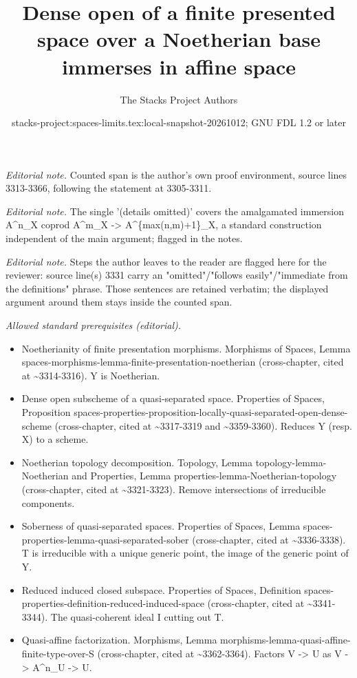 \documentclass{stacks-project}
\title{Dense open of a finite presented space over a Noetherian base immerses in affine space}
\author{The Stacks Project Authors}
\date{stacks-project:spaces-limits.tex:local-snapshot-20261012; GNU FDL 1.2 or later}
\theoremstyle{plain}
\theoremstyle{definition}
\theoremstyle{remark}
\numberwithin{equation}{subsection}
\begin{document}
\maketitle
\noindent\textit{Editorial note.} Counted span is the author's own proof environment, source lines 3313-3366, following the statement at 3305-3311.\par\medskip
\noindent\textit{Editorial note.} The single '(details omitted)' covers the amalgamated immersion A\textasciicircum{}n\_X coprod A\textasciicircum{}m\_X -> A\textasciicircum{}\{max(n,m)+1\}\_X, a standard construction independent of the main argument; flagged in the notes.\par\medskip
\noindent\textit{Editorial note.} Steps the author leaves to the reader are flagged here for the reviewer: source line(s) 3331 carry an "omitted"/"follows easily"/"immediate from the definitions" phrase. Those sentences are retained verbatim; the displayed argument around them stays inside the counted span.\par\medskip
\noindent\textit{Allowed standard prerequisites (editorial).}\begin{itemize}
\item Noetherianity of finite presentation morphisms. Morphisms of Spaces, Lemma spaces-morphisms-lemma-finite-presentation-noetherian (cross-chapter, cited at \textasciitilde{}3314-3316). Y is Noetherian.
\item Dense open subscheme of a quasi-separated space. Properties of Spaces, Proposition spaces-properties-proposition-locally-quasi-separated-open-dense-scheme (cross-chapter, cited at \textasciitilde{}3317-3319 and \textasciitilde{}3359-3360). Reduces Y (resp. X) to a scheme.
\item Noetherian topology decomposition. Topology, Lemma topology-lemma-Noetherian and Properties, Lemma properties-lemma-Noetherian-topology (cross-chapter, cited at \textasciitilde{}3321-3323). Remove intersections of irreducible components.
\item Soberness of quasi-separated spaces. Properties of Spaces, Lemma spaces-properties-lemma-quasi-separated-sober (cross-chapter, cited at \textasciitilde{}3336-3338). T is irreducible with a unique generic point, the image of the generic point of Y.
\item Reduced induced closed subspace. Properties of Spaces, Definition spaces-properties-definition-reduced-induced-space (cross-chapter, cited at \textasciitilde{}3341-3344). The quasi-coherent ideal I cutting out T.
\item Quasi-affine factorization. Morphisms, Lemma morphisms-lemma-quasi-affine-finite-type-over-S (cross-chapter, cited at \textasciitilde{}3362-3364). Factors V -> U as V -> A\textasciicircum{}n\_U -> U.
\end{itemize}\medskip
\end{document}
